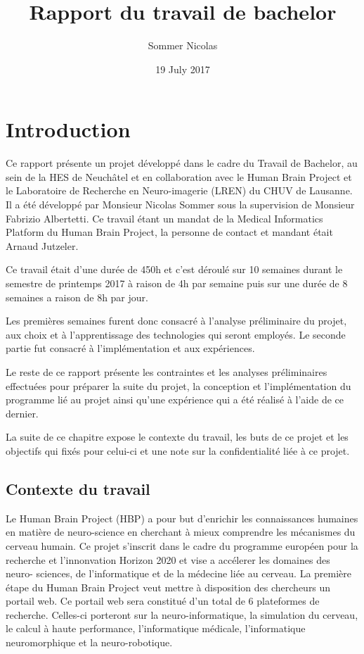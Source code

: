 \documentclass[a4paper,10pt,openany,oneside]{sphinxmanual}
\title{Rapport du travail de bachelor}
\date{19 July 2017}
\author{Sommer Nicolas}
\begin{document}
\maketitle
\tableofcontents
{}\label{index::doc}



\chapter{Introduction}
\label{index:introduction}\label{index:rapport-du-travail-de-bachelor}
Ce rapport présente un projet développé dans le cadre du Travail de Bachelor, au sein de la HES de Neuchâtel
et en collaboration avec le Human Brain Project et le Laboratoire de Recherche en Neuro-imagerie (LREN)
du CHUV de Lausanne. Il a été développé par Monsieur Nicolas Sommer sous la supervision de Monsieur
Fabrizio Albertetti. Ce travail étant un mandat de la Medical Informatics Platform du Human Brain Project,
la personne de contact et mandant était Arnaud Jutzeler.

Ce travail était d'une durée de 450h et c'est déroulé sur 10 semaines durant le semestre de
printemps 2017 à raison de 4h par semaine puis sur une durée de 8 semaines a raison de 8h par
jour.

Les premières semaines furent donc consacré à l'analyse préliminaire du projet, aux choix et à
l'apprentissage des technologies qui seront employés. Le seconde partie fut consacré à l'implémentation
et aux expériences.

Le reste de ce rapport présente les contraintes et les analyses préliminaires effectuées pour préparer
la suite du projet, la conception et l'implémentation du programme lié au projet ainsi qu'une expérience
qui a été réalisé à l'aide de ce dernier.

La suite de ce chapitre expose le contexte du travail, les buts de ce projet et les objectifs qui fixés pour
celui-ci et une note sur la confidentialité liée à ce projet.


\section{Contexte du travail}
\label{index:contexte-du-travail}
Le Human Brain Project (HBP) a pour but d'enrichir les connaissances humaines en matière de neuro-science
en cherchant à mieux comprendre les mécanismes du cerveau humain. Ce projet s'inscrit dans le cadre du
programme européen pour la recherche et l'innonvation Horizon 2020 et vise a accélerer les domaines des neuro-
sciences, de l'informatique et de la médecine liée au cerveau. La première étape du Human Brain Project veut
mettre à disposition des chercheurs un portail web. Ce portail web sera constitué d'un total de 6 plateformes
de recherche. Celles-ci porteront sur la neuro-informatique, la simulation du cerveau, le calcul à haute performance,
l'informatique médicale, l'informatique neuromorphique et la neuro-robotique.
\end{document}
